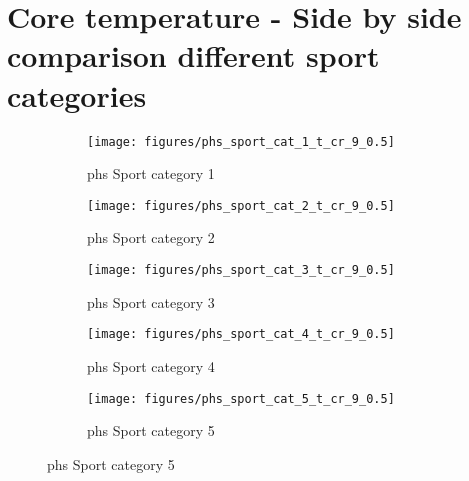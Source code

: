 \documentclass[11pt]{article}
\begin{document}
    \clearpage

%

    \clearpage

    \section{Core temperature - Side by side comparison different sport categories}\label{sec:side-by-side-comparison-categories}

    \begin{figure}[htb!]
        \centering

        \begin{subfigure}{.5\textwidth}
            \centering
            \caption{phs Sport category 1}\label{fig:phs_sport_cat_1_t_cr}
            \texttt{[image: figures/phs\_sport\_cat\_1\_t\_cr\_9\_0.5]}
        \end{subfigure}%
        \hfill

        \begin{subfigure}{.5\textwidth}
            \centering
            \caption{phs Sport category 2}\label{fig:phs_sport_cat_2_t_cr}
            \texttt{[image: figures/phs\_sport\_cat\_2\_t\_cr\_9\_0.5]}
        \end{subfigure}%
        \hfill
        \begin{subfigure}{.5\textwidth}
            \centering
            \caption{phs Sport category 3}\label{fig:phs_sport_cat_3_t_cr}
            \texttt{[image: figures/phs\_sport\_cat\_3\_t\_cr\_9\_0.5]}
        \end{subfigure}%
        \hfill
        \begin{subfigure}{.5\textwidth}
            \centering
            \caption{phs Sport category 4}\label{fig:phs_sport_cat_4_t_cr}
            \texttt{[image: figures/phs\_sport\_cat\_4\_t\_cr\_9\_0.5]}
        \end{subfigure}%
        \hfill
        \begin{subfigure}{.5\textwidth}
            \centering
            \caption{phs Sport category 5}\label{fig:phs_sport_cat_5_t_cr}
            \texttt{[image: figures/phs\_sport\_cat\_5\_t\_cr\_9\_0.5]}
        \end{subfigure}%
        \hfill

    \end{figure}
\end{document}
